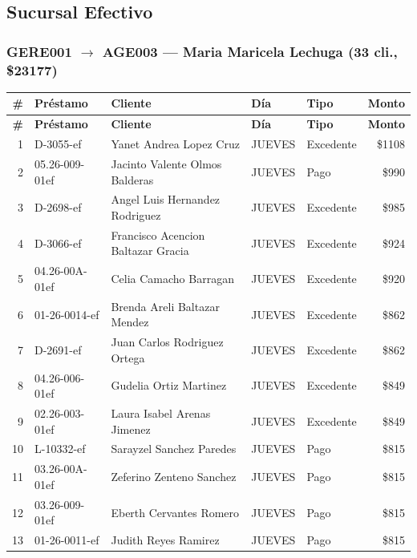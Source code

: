 \documentclass[11pt,a4paper]{article}
\newcommand{\money}[1]{\$\num{#1}}
\begin{document}
\subsection{Sucursal Efectivo}

\subsubsection{GERE001 $\rightarrow$ AGE003 --- Maria Maricela Lechuga (33 cli., \money{23177})}


\begin{center}
\renewcommand{\arraystretch}{1.1}
\footnotesize
\begin{longtable}{rlp{5.5cm}llr}
\toprule
\textbf{\#} & \textbf{Pr\'estamo} & \textbf{Cliente} & \textbf{D\'ia} & \textbf{Tipo} & \textbf{Monto} \\
\midrule
\endfirsthead
\toprule
\textbf{\#} & \textbf{Pr\'estamo} & \textbf{Cliente} & \textbf{D\'ia} & \textbf{Tipo} & \textbf{Monto} \\
\midrule
\endhead
1 & D-3055-ef & Yanet Andrea Lopez Cruz & JUEVES & Excedente & \money{1108} \\
2 & 05.26-009-01ef & Jacinto Valente Olmos Balderas & JUEVES & Pago & \money{990} \\
3 & D-2698-ef & Angel Luis Hernandez Rodriguez & JUEVES & Excedente & \money{985} \\
4 & D-3066-ef & Francisco Acencion Baltazar Gracia & JUEVES & Excedente & \money{924} \\
5 & 04.26-00A-01ef & Celia Camacho Barragan & JUEVES & Excedente & \money{920} \\
6 & 01-26-0014-ef & Brenda Areli Baltazar Mendez & JUEVES & Excedente & \money{862} \\
7 & D-2691-ef & Juan Carlos Rodriguez Ortega & JUEVES & Excedente & \money{862} \\
8 & 04.26-006-01ef & Gudelia Ortiz Martinez & JUEVES & Excedente & \money{849} \\
9 & 02.26-003-01ef & Laura Isabel Arenas Jimenez & JUEVES & Excedente & \money{849} \\
10 & L-10332-ef & Sarayzel Sanchez Paredes & JUEVES & Pago & \money{815} \\
11 & 03.26-00A-01ef & Zeferino Zenteno Sanchez & JUEVES & Pago & \money{815} \\
12 & 03.26-009-01ef & Eberth Cervantes Romero & JUEVES & Pago & \money{815} \\
13 & 01-26-0011-ef & Judith Reyes Ramirez & JUEVES & Pago & \money{815} \\

\end{longtable}
\end{center}
\end{document}

